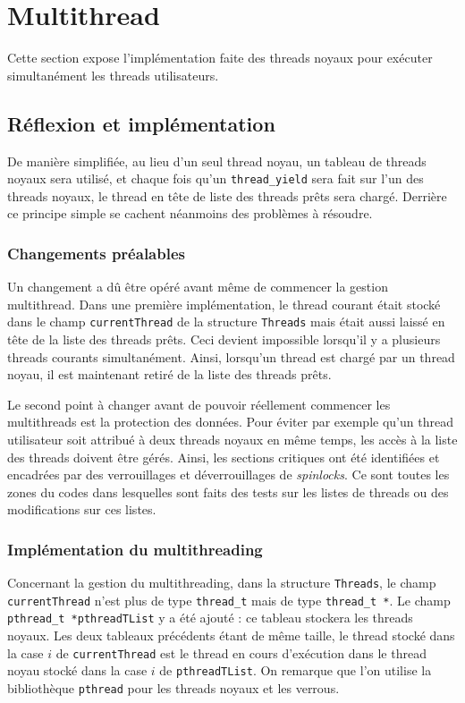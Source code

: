 \documentclass[a4paper,11pt]{article}
\begin{document}
\section{Multithread}

Cette section expose l'implémentation faite des threads noyaux pour exécuter simultanément les threads utilisateurs.

\subsection{Réflexion et implémentation}

De manière simplifiée, au lieu d'un seul thread noyau, un tableau de threads noyaux sera utilisé, et chaque fois qu'un \texttt{thread\_yield} sera fait sur l'un des threads noyaux, le thread en tête de liste des threads prêts sera chargé. Derrière ce principe simple se cachent néanmoins des problèmes à résoudre.

\subsubsection*{Changements préalables}

Un changement a dû être opéré avant même de commencer la gestion multithread. Dans une première implémentation, le thread courant était stocké dans le champ \texttt{currentThread} de la structure \texttt{Threads} mais était aussi laissé en tête de la liste des threads prêts. Ceci devient impossible lorsqu'il y a plusieurs threads courants simultanément. Ainsi, lorsqu'un thread est chargé par un thread noyau, il est maintenant retiré de la liste des threads prêts.

Le second point à changer avant de pouvoir réellement commencer les multithreads est la protection des données. Pour éviter par exemple qu'un thread utilisateur soit attribué à deux threads noyaux en même temps, les accès à la liste des threads doivent être gérés. Ainsi, les sections critiques ont été identifiées et encadrées par des verrouillages et déverrouillages de \textit{spinlocks}. Ce sont toutes les zones du codes dans lesquelles sont faits des tests sur les listes de threads ou des modifications sur ces listes.

\subsubsection*{Implémentation du multithreading}

Concernant la gestion du multithreading, dans la structure \texttt{Threads}, le champ \texttt{currentThread} n'est plus de type \texttt{thread\_t} mais de type \texttt{thread\_t *}. Le champ \texttt{pthread\_t *pthreadTList} y a été ajouté : ce tableau stockera les threads noyaux. Les deux tableaux précédents étant de même taille, le thread stocké dans la case $i$ de \texttt{currentThread} est le thread en cours d'exécution dans le thread noyau stocké dans la case $i$ de \texttt{pthreadTList}. On remarque que l'on utilise la bibliothèque \texttt{pthread} pour les threads noyaux et les verrous.
\end{document}
